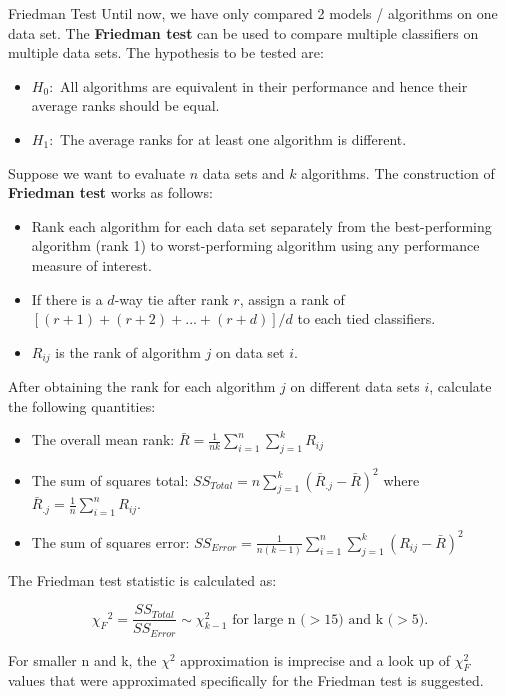     \begin{frame}[c,allowframebreaks]{Friedman Test}
    Until now, we have only compared 2 models / algorithms on one data set. The \textbf{Friedman test} can be used to compare multiple classifiers on multiple data sets. The hypothesis to be tested are:
    \begin{itemize}
    \item $H_0:$ All algorithms are equivalent in their performance and hence their average ranks should be equal.
    \item $H_1:$ The average ranks for at least one algorithm is different.
    \end{itemize}

    Suppose we want to evaluate $n$ data sets and $k$ algorithms. The construction of \textbf{Friedman test} works as follows:

    \begin{itemize}
      \item Rank each algorithm for each data set separately from the best-performing algorithm (rank 1) to worst-performing algorithm using any performance measure of interest.
      \item If there is a $d$-way tie after rank $r$, assign a rank of $ \left[(r+1) + (r+2) + ... + (r+d)\right] /d $ to each tied classifiers.
      \item $R_{ij}$ is the rank of algorithm $j$ on data set $i$.
    \end{itemize}

    \framebreak

    After obtaining the rank for each algorithm $j$ on different data sets $i$, calculate the following quantities:

    \begin{itemize}
      \item The overall mean rank:
      $ \bar{R} = \frac{1}{nk} \sum_{i=1}^{n} \sum_{j=1}^{k} R_{ij} $
      \item The sum of squares total:
      $ SS_{Total} = n \sum_{j=1}^{k} (\bar{R}_{.j} - \bar{R})^2 $ where $\bar{R}_{.j} =  \frac{1}{n} \sum_{i=1}^{n} R_{ij}$.
      \item The sum of squares error:
      $ SS_{Error} = \frac{1}{n(k-1)} \sum_{i=1}^{n} \sum_{j=1}^{k} (R_{ij} - \bar{R})^2 $
    \end{itemize}

    The Friedman test statistic is calculated as:

    $${\chi_F}^2 = \frac{SS_{Total}}{SS_{Error}} \sim \chi_{k-1}^2 \text{ for
    large n ($>$15) and k ($>$5).}$$

    For smaller n and k, the $\chi^2$ approximation is imprecise and a look up of $\chi_F^2$ values that were approximated specifically for the Friedman test is suggested.
    \end{frame}


